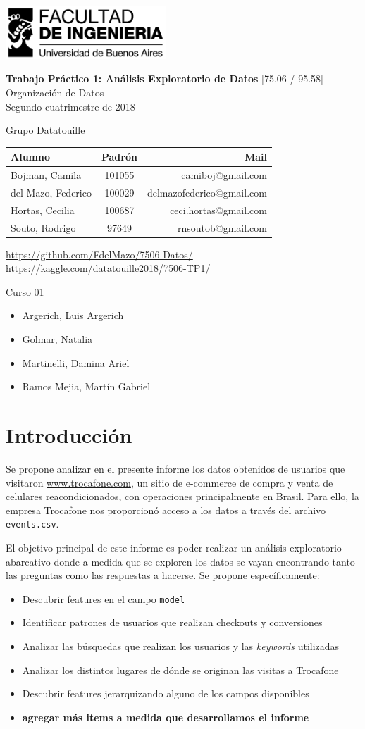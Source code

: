 \documentclass[a4paper]{article}
\makeatletter
\newcommand{\materia}{[75.06 / 95.58] Organización de Datos}
\newcommand{\trabajo}{Trabajo Práctico 1: Análisis Exploratorio de Datos}
\newcommand{\cuatrimestre}{Segundo cuatrimestre de 2018}
\newcommand{\grupo}{Grupo Datatouille}
\newcommand{\repo}{https://github.com/FdelMazo/7506-Datos/}
\newcommand{\kernel}{https://kaggle.com/datatouille2018/7506-TP1/}
\newcommand{\alumnos}{
    Bojman, Camila & 101055 &  camiboj@gmail.com\\
    del Mazo, Federico & 100029 & delmazofederico@gmail.com\\
    Hortas, Cecilia & 100687 & ceci.hortas@gmail.com\\
    Souto, Rodrigo & 97649 & rnsoutob@gmail.com\\
}
\newcommand{\curso}{Curso 01}
\newcommand{\docentes}{
    \item Argerich, Luis Argerich
    \item Golmar, Natalia
    \item Martinelli, Damina Ariel
    \item Ramos Mejia, Martín Gabriel
}
\makeatother
\begin{document}

\begin{titlepage}
	\hfill\includegraphics[width=6cm]{fiuba.jpg}
    \begin{center}
    \vfill
    \Huge \textbf{\trabajo}
    \vskip2cm
    \Large \materia\\
    \cuatrimestre
    \vfill
    \begin{flushleft} 
    \grupo
    \end{flushleft}
    \begin{tabular}{|l|c|r|}
	\hline
	Alumno & Padrón & Mail\\
	\hline \hline
    \alumnos
	\hline
	\end{tabular}
    \begin{flushleft} 
    \url{\repo} \\
    \url{\kernel}
    \end{flushleft}
    \vskip1cm
    \end{center}
    \curso
    \begin{itemize}
        \docentes
    \end{itemize}
\end{titlepage}
\tableofcontents
\newpage
{}
\setcounter{page}{1}

\section{Introducción}

Se propone analizar en el presente informe los datos obtenidos de usuarios que visitaron \url{www.trocafone.com}, un sitio de e-commerce de compra y venta de celulares reacondicionados, con operaciones principalmente en Brasil. Para ello, la empresa Trocafone nos proporcionó acceso a los datos a través del archivo \texttt{events.csv}. 

El objetivo principal de este informe es poder realizar un análisis exploratorio abarcativo donde a medida que se exploren los datos se vayan encontrando tanto las preguntas como las respuestas a hacerse. Se propone específicamente:
 
 \begin{itemize}
	 \item Descubrir features en el campo \texttt{model}
	 \item Identificar patrones de usuarios que realizan checkouts y conversiones
	 \item Analizar las búsquedas que realizan los usuarios y las \textit{keywords} utilizadas
	 \item Analizar los distintos lugares de dónde se originan las visitas a Trocafone
	 \item Descubrir features jerarquizando alguno de los campos disponibles
	 \item \textbf{agregar más items a medida que desarrollamos el informe}
\end{itemize}
\end{document}
